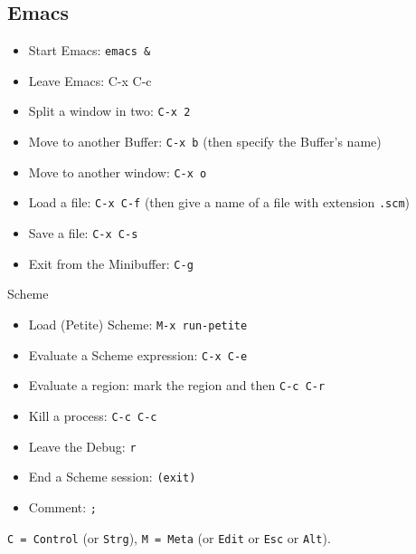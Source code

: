 \documentclass[12pt]{amsart}
\begin{document}
\subsection{Emacs}\label{emacs}
\begin{itemize}
\item Start Emacs: \texttt{emacs \&}\\
\item Leave Emacs: C-x C-c\\
\item Split a window in two: \texttt{C-x 2}\\
\item Move to another Buffer: \texttt{C-x b}
(then specify the Buffer's name)\\
\item Move to another window: \texttt{C-x o}\\
\item Load a file: \texttt{C-x C-f}
(then give a name of a file with extension \texttt{.scm})\\
\item Save a file: \texttt{C-x C-s}\\
\item Exit from the Minibuffer: \texttt{C-g}\\
\end{itemize}

\begin{center}
\begin{large}
Scheme\\
\end{large}
\end{center}
\vspace{3 mm}

\begin{itemize}
\item Load  (Petite) Scheme:  \texttt{M-x run-petite}\\
\item Evaluate a Scheme expression: \texttt{C-x C-e}\\
\item Evaluate a region: mark the region and then \texttt{C-c C-r}\\
\item Kill a process: \texttt{C-c C-c} \\
\item Leave the Debug: \texttt{r}\\
\item End a Scheme session: \texttt{(exit)}\\
\item Comment: \texttt{;}\\
\end{itemize}
\texttt{C = Control} (or \texttt{Strg}), \texttt{M = Meta} (or
\texttt{Edit} or \texttt{Esc} or \texttt{Alt}).
\end{document}
